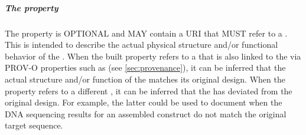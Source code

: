 \subparagraph{The  property}\label{sec:built}
The  property is OPTIONAL and MAY contain a URI that MUST refer to a . This  is intended to describe the actual physical structure and/or functional behavior of the . When the built property refers to a  that is also linked to the  via PROV-O properties such as  (see \ref{sec:provenance}), it can be inferred that the actual structure and/or function of the  matches its original design. When the  property refers to a different , it can be inferred that the  has deviated from the original design. For example, the latter could be used to document when the DNA sequencing results for an assembled construct do not match the original target sequence.


